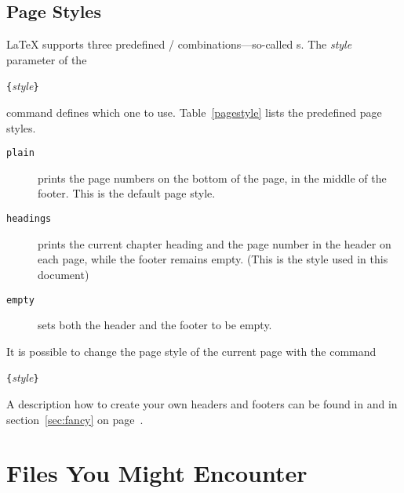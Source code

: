 \subsection{Page Styles}

\LaTeX{} supports three predefined /
combinations---so-called s. The \emph{style} parameter
of the 
\begin{lscommand}
\verb|{|\emph{style}\verb|}|
\end{lscommand}
\noindent command defines which one to use.
Table~\ref{pagestyle}
lists the predefined page styles.

\begin{table}[!hbp]
\caption{The Predefined Page Styles of \LaTeX.} \label{pagestyle}
\begin{lined}{\textwidth}
\begin{description}

\item[\normalfont\texttt{plain}] prints the page numbers on the bottom
  of the page, in the middle of the footer. This is the default page
  style.

\item[\normalfont\texttt{headings}] prints the current chapter heading
  and the page number in the header on each page, while the footer
  remains empty.  (This is the style used in this document)
\item[\normalfont\texttt{empty}] sets both the header and the footer
  to be empty.

\end{description}
\end{lined}
\end{table}

It is possible to change the page style of the current page
with the command
\begin{lscommand}
\verb|{|\emph{style}\verb|}|
\end{lscommand}
A description how to create your own
headers and footers can be found in \companion{} and in section~\ref{sec:fancy} on page~\pageref{sec:fancy}.
%
%

\section{Files You Might Encounter}

